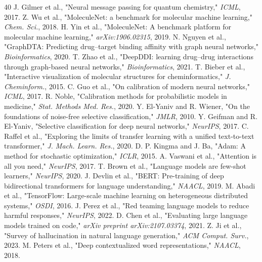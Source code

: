 \documentclass[conference]{IEEEtran}
\begin{document}
\begin{thebibliography}{40}
J. Gilmer et al., "Neural message passing for quantum chemistry," \emph{ICML}, 2017.
Z. Wu et al., "MoleculeNet: a benchmark for molecular machine learning," \emph{Chem. Sci.}, 2018.
H. Yin et al., "MoleculeNet: A benchmark platform for molecular machine learning," \emph{arXiv:1906.02315}, 2019.
N. Nguyen et al., "GraphDTA: Predicting drug--target binding affinity with graph neural networks," \emph{Bioinformatics}, 2020.
T. Zhao et al., "DeepDDI: learning drug--drug interactions through graph-based neural networks," \emph{Bioinformatics}, 2021.
T. Bieber et al., "Interactive visualization of molecular structures for cheminformatics," \emph{J. Cheminform.}, 2015.
C. Guo et al., "On calibration of modern neural networks," \emph{ICML}, 2017.
R. Noble, "Calibration methods for probabilistic models in medicine," \emph{Stat. Methods Med. Res.}, 2020.
Y. El-Yaniv and R. Wiener, "On the foundations of noise-free selective classification," \emph{JMLR}, 2010.
Y. Geifman and R. El-Yaniv, "Selective classification for deep neural networks," \emph{NeurIPS}, 2017.
C. Raffel et al., "Exploring the limits of transfer learning with a unified text-to-text transformer," \emph{J. Mach. Learn. Res.}, 2020.
D. P. Kingma and J. Ba, "Adam: A method for stochastic optimization," \emph{ICLR}, 2015.
A. Vaswani et al., "Attention is all you need," \emph{NeurIPS}, 2017.
T. Brown et al., "Language models are few-shot learners," \emph{NeurIPS}, 2020.
J. Devlin et al., "BERT: Pre-training of deep bidirectional transformers for language understanding," \emph{NAACL}, 2019.
M. Abadi et al., "TensorFlow: Large-scale machine learning on heterogeneous distributed systems," \emph{OSDI}, 2016.
J. Perez et al., "Red teaming language models to reduce harmful responses," \emph{NeurIPS}, 2022.
D. Chen et al., "Evaluating large language models trained on code," \emph{arXiv preprint arXiv:2107.03374}, 2021.
Z. Ji et al., "Survey of hallucination in natural language generation," \emph{ACM Comput. Surv.}, 2023.
M. Peters et al., "Deep contextualized word representations," \emph{NAACL}, 2018.

\end{thebibliography}
\end{document}
